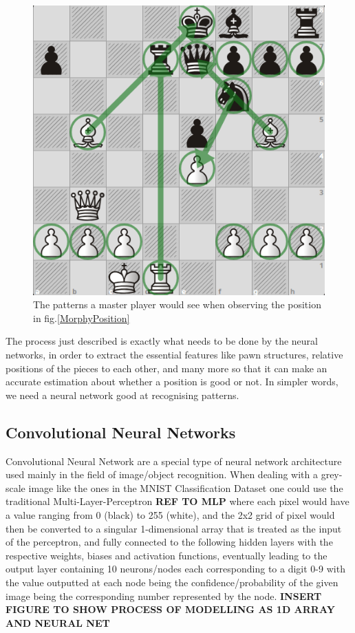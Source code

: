 \begin{figure}[H]
    \centering
    \includegraphics[scale=0.45]{images/MorphyAnotated.png}
    \caption{The patterns a master player would see when observing the position in fig.\ref{MorphyPosition}}
    \label{MorphyAnotated}
\end{figure}

The process just described is exactly what needs to be done by the neural networks, in order to extract the essential features like pawn structures, relative positions of the pieces to each other, and many more so that it can make an accurate estimation about whether a position is good or not. In simpler words, we need a neural network good at recognising patterns.

\subsection{Convolutional Neural Networks}
Convolutional Neural Network are a special type of neural network architecture used mainly in the field of image/object recognition. When dealing with a grey-scale image like the ones in the MNIST Classification Dataset \cite{MNIST} one could use the traditional Multi-Layer-Perceptron \textbf{REF TO MLP} where each pixel would have a value ranging from 0 (black) to 255 (white), and the 2x2 grid of pixel would then be converted to a singular 1-dimensional array that is treated as the input of the perceptron, and fully connected to the following hidden layers with the respective weights, biases and activation functions, eventually leading to the output layer containing 10 neurons/nodes each corresponding to a digit 0-9 with the value outputted at each node being the confidence/probability of the given image being the corresponding number represented by the node. \textbf{INSERT FIGURE TO SHOW PROCESS OF MODELLING AS 1D ARRAY AND NEURAL NET}

